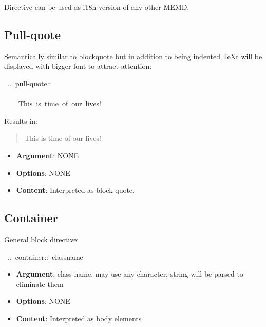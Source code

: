 \documentclass[12pt]{article}
\newenvironment{pullquote}{\begin{quotation}\Large}{\end{quotation}}
\begin{document}
Directive can be used as i18n version of any other MEMD.

\hypertarget{lpull-quote}{}
\subsection{Pull-quote}

Semantically similar to blockquote but in addition to being indented \TeX{}t will
be displayed with bigger font to attract attention:

\begin{ttfamily}\begin{flushleft}
\mbox{~..~pull-quote::~}\\
\mbox{}\\
\mbox{~~~~This~is~time~of~our~lives!}\\
\end{flushleft}\end{ttfamily}

Results in:

\begin{pullquote}
 This is time of our lives!
\end{pullquote}
\begin{itemize}
\item
\textbf{Argument}: NONE

\item
\textbf{Options}: NONE

\item
\textbf{Content}: Interpreted as block quote.
\end{itemize}
\hypertarget{lcontainer}{}
\subsection{Container}

General block directive:

\begin{ttfamily}\begin{flushleft}
\mbox{~..~container::~classname}\\
\end{flushleft}\end{ttfamily}

\begin{itemize}
\item
\textbf{Argument}: class name, may use any character, string will be parsed to
eliminate them

\item
\textbf{Options}: NONE

\item
\textbf{Content}: Interpreted as body elements
\end{itemize}
\end{document}
